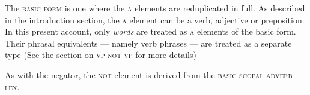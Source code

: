 \documentclass[12pt, UTF8]{article}
\begin{document}
The \textsc{basic form} is one where the \textsc{a} elements are reduplicated in full. As described in the introduction section, the \textsc{a} element can be a verb, adjective or preposition. In this present account, only \textit{words} are treated as \textsc{a} elements of the basic form. Their phrasal equivalents --- namely verb phrases --- are treated as a separate type (See the section on \textsc{vp-not-vp} for more details)
%

As with the negator, the \textsc{not} element is derived from the \textsc{basic-scopal-adverb-lex}.
\end{document}
